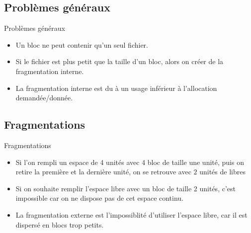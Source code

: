 \begin{frame}{\sectitle}
\def\subsectitle{Problèmes généraux}
\subsection{\subsectitle}
\begin{block}{\subsectitle}
\begin{itemize}
    \item Un bloc ne peut contenir qu'un seul fichier.
    \item Si le fichier est plus petit que la taille d'un bloc, alors on créer
        de la fragmentation interne.
    \item La fragmentation interne est du à un usage inférieur à l'allocation
        demandée/donnée.
\end{itemize}
\end{block}


\def\subsectitle{Fragmentations}
\subsection{\subsectitle}
\begin{block}{\subsectitle}
    \begin{itemize}
        \item Si l'on rempli un espace de 4 unités avec 4 bloc de taille une
            unité, puis on retire la première et la dernière unité, on se
            retrouve avec 2 unités de libres
        \item Si on souhaite remplir l'espace libre avec un bloc de taille 2
            unités, c'est impossible car on ne dispose pas de cet espace
            continu.
        \item La fragmentation externe est l'impossiblité d'utiliser l'espace
            libre, car il est dispersé en blocs trop petits.
    \end{itemize}
\end{block}
\end{frame}


\def\sectitle{Grands fichiers}
